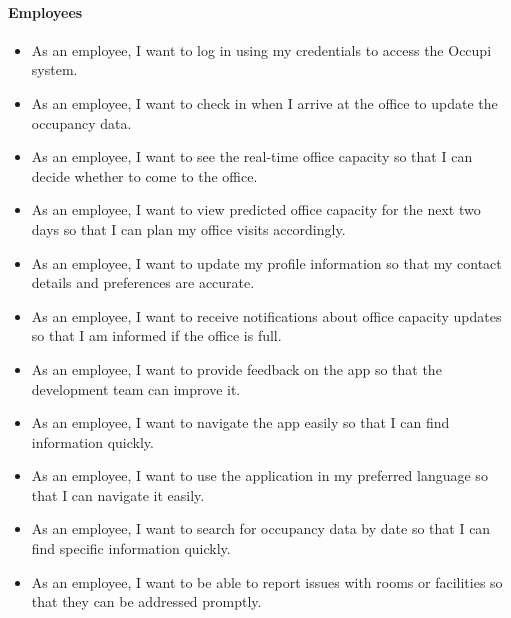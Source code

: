 \documentclass[11pt,a4paper]{article}
\begin{document}
\paragraph{Employees}
\begin{itemize}
    \item As an employee, I want to log in using my credentials to access the Occupi system.
    \item As an employee, I want to check in when I arrive at the office to update the occupancy data.
    \item As an employee, I want to see the real-time office capacity so that I can decide whether to come to the office.
    \item As an employee, I want to view predicted office capacity for the next two days so that I can plan my office visits accordingly.
    \item As an employee, I want to update my profile information so that my contact details and preferences are accurate.
    \item As an employee, I want to receive notifications about office capacity updates so that I am informed if the office is full.
    \item As an employee, I want to provide feedback on the app so that the development team can improve it.
    \item As an employee, I want to navigate the app easily so that I can find information quickly.
    \item As an employee, I want to use the application in my preferred language so that I can navigate it easily.
    \item As an employee, I want to search for occupancy data by date so that I can find specific information quickly.
    \item As an employee, I want to be able to report issues with rooms or facilities so that they can be addressed promptly.
\end{itemize}
\end{document}
